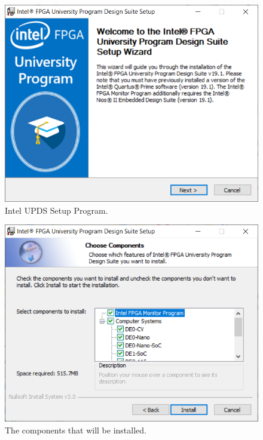 \documentclass[11pt, twoside, pdftex]{article}
\begin{document}
\begin{enumerate}
\begin{figure}[H]
   	\begin{center}
           \includegraphics[scale=0.7]{screenshots/figure1.png}
   	\end{center}
      \caption{Intel UPDS Setup Program.}
			\label{fig:1}
\end{figure}

\begin{figure}[H]
   	\begin{center}
            \includegraphics[scale=0.7]{screenshots/figure2.png}
   	\end{center}
      \caption{The components that will be installed.}
			\label{fig:2}
\end{figure}
~\\
	 

\end{enumerate}
\end{document}

